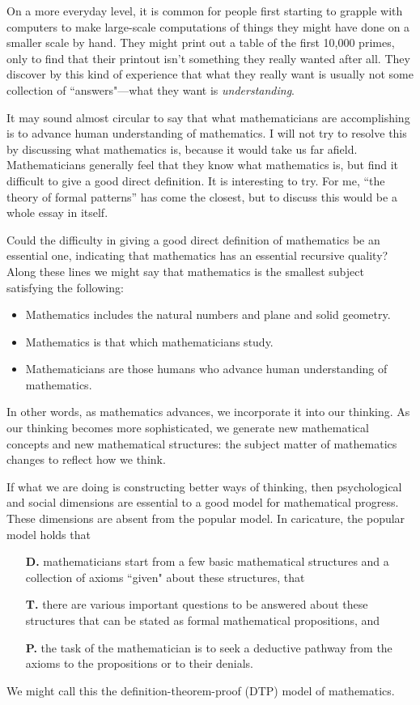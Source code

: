 On a more everyday level, it is common for people first 
starting to 
grapple with computers to make large-scale computations
of things they  might have done on a smaller scale by hand.
They might print out a table of the first 10,000 primes,
only to find that their printout isn't 
something they really wanted after all.  They discover by 
this kind of
experience that what they really want is usually not some
collection of ``answers"---what they want is {\it 
understanding}. 

\bigskip

It may sound almost circular to say that what
mathematicians are accomplishing is
to advance human understanding of mathematics.
I will not try to resolve this by discussing what 
mathematics is,
because it would take us far afield. Mathematicians 
generally feel that
they know what mathematics is, but find it difficult to 
give a good direct
definition. It is interesting to try. For me, ``the theory 
of formal
patterns'' has come the closest, but to discuss this would 
be a whole essay in
itself.

Could the difficulty in giving a good direct definition of 
mathematics
be an essential one, indicating that mathematics has an 
essential
recursive quality? Along these lines we might say that 
mathematics
is the smallest subject satisfying the following:
\begin{itemize}
\item Mathematics includes the natural numbers and plane 
and solid geometry.
\item Mathematics is that which mathematicians study.
\item Mathematicians are those humans who advance human 
understanding of
mathematics.
\end{itemize}
In other words, as mathematics advances, we incorporate it 
into our thinking.
As our thinking becomes more sophisticated, we generate 
new mathematical
concepts and new mathematical structures: the subject 
matter of
mathematics changes to reflect how we think.

\medskip
If what we are doing is constructing better ways of 
thinking, then
psychological and social dimensions are essential to a 
good model
for mathematical progress.  These dimensions are absent 
from the popular
model.  In caricature, the popular model
holds that
\begin{itemize}
\item[\bf D.]
 mathematicians start from a few basic mathematical 
structures
and a collection of axioms ``given" about these 
structures, that 
\item[\bf T.]
there are various important questions 
to be answered about these structures that can be stated 
as formal mathematical
propositions, and
\item[\bf P.]
the task of the 
mathematician is to seek a deductive pathway from the 
axioms to 
the propositions or to their denials.
\end{itemize}
 We might call this the
definition-theorem-proof (DTP) model of mathematics.

